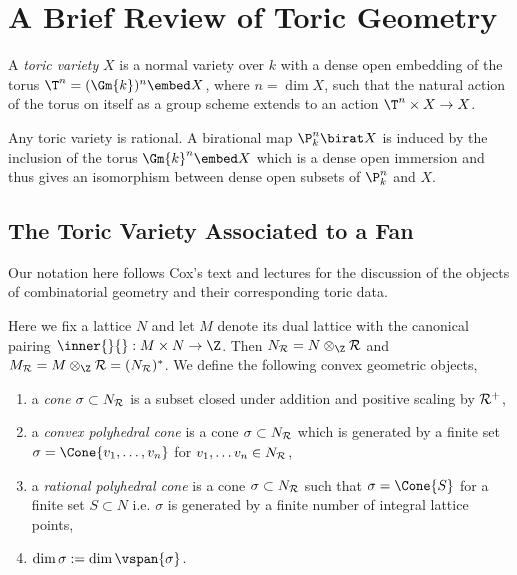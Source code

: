 \section{A Brief Review of Toric Geometry}

\begin{defn}
A \textit{toric variety} $X$ is a normal variety over $k$ with a dense open embedding of the torus $\T^n = (\Gm{k})^n \embed X$, where $n = \dim{X}$, such that the natural action of the torus on itself as a group scheme extends to an action $\T^n \times X \to X$. 
\end{defn}

\begin{rmk}
Any toric variety is rational. A birational map $\P^n_k \birat X$ is induced by the inclusion of the torus $\Gm{k}^n \embed X$ which is a dense open immersion and thus gives an isomorphism between dense open subsets of $\P^n_k$ and $X$.
\end{rmk}


\subsection{The Toric Variety Associated to a Fan}

Our notation here follows Cox's text and lectures \cite{cox,cox_lectures} for the discussion of the objects of combinatorial geometry and their corresponding toric data.

\begin{defn}
Here we fix a lattice $N$ and let $M$ denote its dual lattice with the canonical pairing $\inner{}{} : M \times N \to \Z$. Then $N_\R = N \otimes_\Z \R$ and $M_\R = M \otimes_\Z \R = (N_\R)^*$. We define the following convex geometric objects,
\begin{enumerate}
\item a \textit{cone} $\sigma \subset N_{\mathcal{R}}$ is a subset closed under addition and positive scaling by $\mathcal{R}^+$,
\item a \textit{convex polyhedral cone} is a cone $\sigma \subset N_{\mathcal{R}}$ which is generated by a finite set $\sigma = \Cone{v_1, \dots, v_n }$ for $v_1, \dots v_n \in N_{\mathcal{R}}$,
\item a \textit{rational polyhedral cone} is a cone $\sigma \subset N_{\mathcal{R}}$ such that $\sigma = \Cone{S}$ for a finite set $S \subset N$ i.e. $\sigma$ is generated by a finite number of integral lattice points,
\item $\dim{\sigma} := \dim{\vspan{\sigma}}$.
\end{enumerate}
\end{defn}

